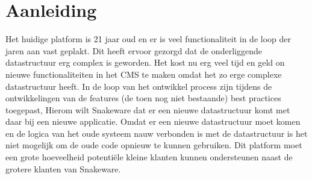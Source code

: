 \section{Aanleiding}
Het huidige platform is 21 jaar oud en er is veel functionaliteit in de loop der jaren aan vast geplakt. Dit
heeft ervoor gezorgd dat de onderliggende datastructuur erg complex is geworden.
Het kost nu erg veel tijd en geld on nieuwe functionaliteiten in het CMS te maken omdat het zo erge complexe datastructuur heeft.
In de loop van het ontwikkel process zijn tijdens de ontwikkelingen van de features (de toen nog niet bestaande) best practices toegepast, 
\whitespace
Hierom wilt Snakeware dat er een nieuwe datastructuur komt met daar bij een nieuwe applicatie. Omdat er
een nieuwe datastructuur moet komen en de logica van het oude systeem nauw verbonden is met de
datastructuur is het niet mogelijk om de oude code opnieuw te kunnen gebruiken. Dit platform moet een
grote hoeveelheid potentiële kleine klanten kunnen ondersteunen naast de grotere klanten van Snakeware.
